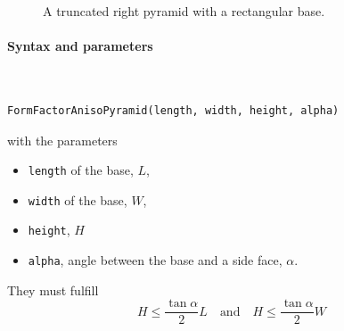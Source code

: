 \begin{figure}[H]
\hfill
{}
\hfill
{}
\hfill
{}
\hfill
\caption{A truncated right pyramid with a rectangular base.}
\end{figure}

\FloatBarrier

\paragraph{Syntax and parameters}\strut\\[-2ex plus .2ex minus .2ex]
\begin{lstlisting}[language=python, style=eclipseboxed,numbers=none,nolol]
  FormFactorAnisoPyramid(length, width, height, alpha)
\end{lstlisting}
with the parameters
\begin{itemize}
\item \texttt{length} of the base, $L$,
\item \texttt{width} of the base, $W$,
\item \texttt{height}, $H$
\item \texttt{alpha}, angle between the base and a side face, $\alpha$.
\end{itemize}
They must fulfill
\begin{displaymath}
  H \le \frac{\tan\alpha}{2} L
  \quad\text{and}\quad
  H \le \frac{\tan\alpha}{2} W
\end{displaymath}

